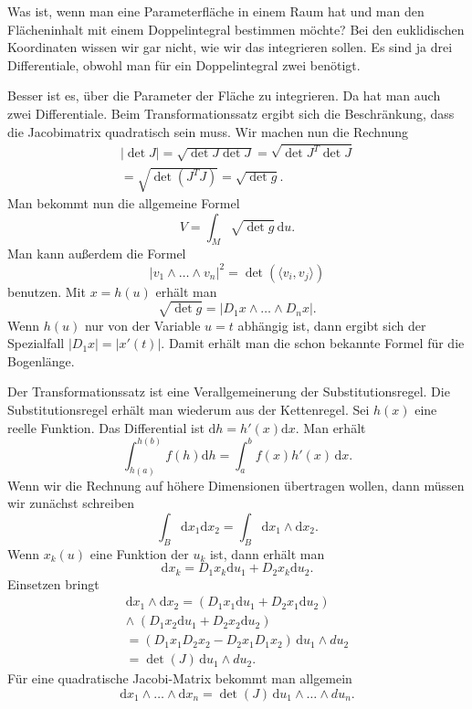 \documentclass[a4paper,10pt,fleqn,twocolumn,twoside]{article}
\numberwithin{equation}{section}
\begin{document}
Was ist, wenn man eine Parameterfläche in einem Raum hat und man den
Flächeninhalt mit einem Doppelintegral bestimmen möchte? Bei den
euklidischen Koordinaten wissen wir gar nicht, wie wir das integrieren
sollen. Es sind ja drei Differentiale, obwohl man für ein
Doppelintegral zwei benötigt.

Besser ist es, über die Parameter der Fläche zu integrieren.
Da hat man auch zwei Differentiale. Beim Transformationssatz ergibt
sich die Beschränkung, dass die Jacobimatrix quadratisch sein muss.
Wir machen nun die Rechnung
\begin{gather*}
|{\det J}| = \sqrt{\det J\det J}
= \sqrt{\det J^T\det J}\\
= \sqrt{\det(J^TJ)} = \sqrt{\det g}.
\end{gather*}
Man bekommt nun die allgemeine Formel
\begin{equation}
V = \int_M \sqrt{\det g}\,\mathrm du.
\end{equation}
Man kann außerdem die Formel
\begin{equation}
|v_1\wedge\ldots\wedge v_n|^2 = \det(\langle v_i,v_j\rangle)
\end{equation}
benutzen. Mit $x=h(u)$ erhält man
\begin{equation}
\sqrt{\det g} = |D_1 x\wedge\ldots\wedge D_n x|.
\end{equation}
Wenn $h(u)$ nur von der Variable $u=t$ abhängig ist, dann ergibt
sich der Spezialfall $|D_1 x| = |x'(t)|$. Damit erhält man die schon
bekannte Formel für die Bogenlänge.

Der Transformationssatz ist eine Verallgemeinerung der
Substitutionsregel. Die Substitutionsregel erhält man wiederum aus
der Kettenregel. Sei $h(x)$ eine reelle Funktion.
Das Differential ist $\mathrm dh = h'(x)\mathrm dx$. Man erhält
\begin{equation}
\int_{h(a)}^{h(b)} f(h)\mathrm dh = \int_a^b f(x) h'(x)\,\mathrm dx.
\end{equation}
Wenn wir die Rechnung auf höhere Dimensionen übertragen wollen, dann
müssen wir zunächst schreiben
\begin{equation}
\int_B \mathrm dx_1\mathrm dx_2 = \int_B \mathrm dx_1\wedge\mathrm dx_2.
\end{equation}
Wenn $x_k(u)$ eine Funktion der $u_k$ ist, dann erhält man
\begin{equation}
\mathrm dx_k = D_1x_k\mathrm du_1+D_2x_k\mathrm du_2.
\end{equation}
Einsetzen bringt
\begin{gather*}
\mathrm dx_1\wedge\mathrm dx_2
= (D_1x_1\mathrm du_1+D_2x_1\mathrm du_2)\\
\wedge\; (D_1x_2\mathrm du_1+D_2x_2\mathrm du_2)\\
= (D_1 x_1 D_2 x_2 - D_2 x_1 D_1 x_2)\,\mathrm du_1\wedge du_2\\
= \det(J)\,\mathrm du_1\wedge du_2.
\end{gather*}
Für eine quadratische Jacobi-Matrix bekommt man allgemein
\begin{equation}
\mathrm dx_1\wedge\ldots\wedge\mathrm dx_n
= \det(J)\,\mathrm du_1\wedge\ldots\wedge du_n.
\end{equation}
\end{document}

